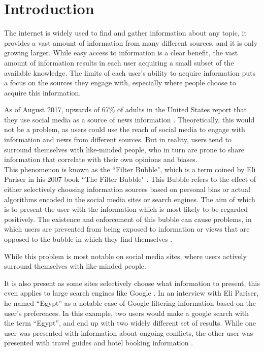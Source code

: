 \chapter{Introduction}
The internet is widely used to find and gather information about any topic, it
provides a vast amount of information from many different sources, and it is
only growing larger.
While easy access to information is a clear benefit, the vast amount of
information results in each user acquiring a small subset of the available
knowledge. The limits of each user's ability to acquire information puts a focus
on the sources they engage with, especially where people choose to acquire this
information.\nl

As of August 2017, upwards of 67\% of adults in the United States report that
they use social media as a source of news information \citep{journalism2017}.
Theoretically, this would not be a problem, as users could use the reach of
social media to engage with information and news from different sources.
But in reality, users tend to surround themselves with like-minded people, who
in turn are prone to share information that correlate with their own opinions
and biases.\\

This phenomenon is known as the ``Filter Bubble", which is a term coined by Eli
Pariser in his 2007 book ``The Filter Bubble" \citep{pariser2011filter}.
This Bubble refers to the effect of either selectively choosing information
sources based on personal bias or actual algorithms encoded in the social media
sites or search engines.
The aim of which is to present the user with the information which is most
likely to be regarded positively.
The existence and enforcement of this bubble can cause problems, in which users
are prevented from being exposed to information or views that are opposed to the
bubble in which they find themselves \citep[p.59-73]{pariser2011filter}.\nl

While this problem is most notable on social media sites, where users actively
surround themselves with like-minded people.

It is also present as some sites selectively choose what information to present,
this even applies to large search engines like Google \citep{filterBubbleDef}.
In an interview with Eli Pariser, he named ``Egypt'' as a notable case of
Google filtering information based on the user's preferences.
In this example, two users would make a google search with the term ``Egypt'',
and end up with two widely different set of results.
While one user was presented with information about ongoing conflicts, the other
user was presented with travel guides and hotel booking information
\citep{nusSduSearch}.